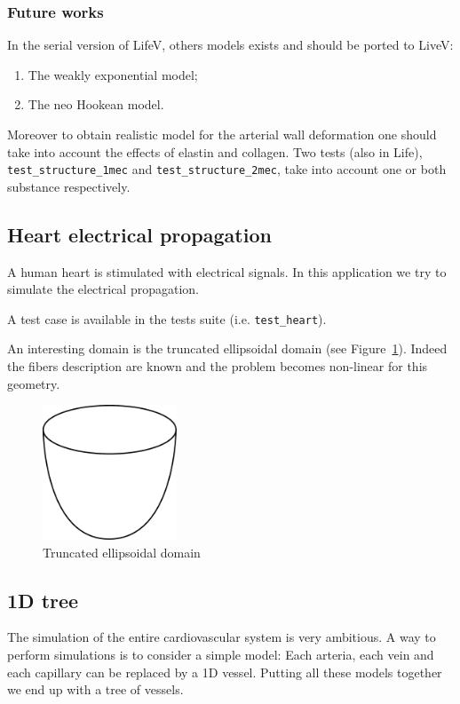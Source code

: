 \documentclass[11pt]{article}
\begin{document}
\subsubsection{Future works}
In the serial version of LifeV, others models exists and should be ported to LiveV:
\begin{enumerate}
\item The weakly exponential model;
\item The neo Hookean model.
\end{enumerate}
Moreover to obtain realistic model for the arterial wall deformation one should take into account the effects of elastin and collagen. Two tests (also in Life), \texttt{test\_structure\_1mec} and \texttt{test\_structure\_2mec}, take into account one or both substance respectively.

\subsection{Heart electrical propagation}
\label{sec:heartElectricalPropagation}
A human heart is stimulated with electrical signals. In this application we try to simulate the electrical propagation.

A test case is available in the tests suite (i.e. \texttt{test\_heart}).

An interesting domain is the truncated ellipsoidal domain (see Figure~\ref{fig:truncatedEllipsoidalDomain}). Indeed the fibers description are known and the problem becomes non-linear for this geometry.
\begin{figure}[H]
\begin{center}
\includegraphics[width=4cm]{images/monoAndBidomain/truncatedellipsoidaldomain.pdf}
\caption{Truncated ellipsoidal domain}
\label{fig:truncatedEllipsoidalDomain}
\end{center}
\end{figure}

\subsection{1D tree}
The simulation of the entire cardiovascular system is very ambitious. A way to perform simulations is to consider a simple model: Each arteria, each vein and each capillary can be replaced by a 1D vessel. Putting all these models together we end up with a tree of vessels.
\end{document}
